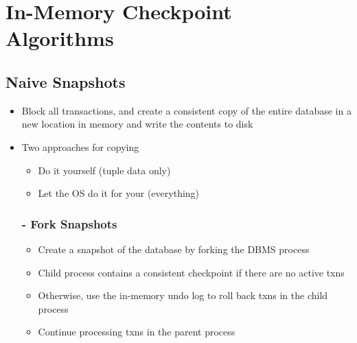 \documentclass[11pt]{article}
\begin{document}
\section{In-Memory Checkpoint Algorithms~\cite{p265-cao}}

    \subsection*{Naive Snapshots}
    \begin{itemize}
        \item Block all transactions, and create a consistent copy of the entire database in a new location in memory and write the contents to disk
        \item Two approaches for copying
        \begin{itemize}
            \item Do it yourself (tuple data only)
            \item Let the OS do it for your (everything)
        \end{itemize}
        \subsubsection*{ - Fork Snapshots~\cite{p195-kemper}}
        \begin{itemize}
            \item Create a snapshot of the database by forking the DBMS process
            \item Child process contains a consistent checkpoint if there are no active txns
            \item Otherwise, use the in-memory undo log to roll back txns in the child process
            \item Continue processing txns in the parent process
        \end{itemize}
    \end{itemize}
\end{document}
